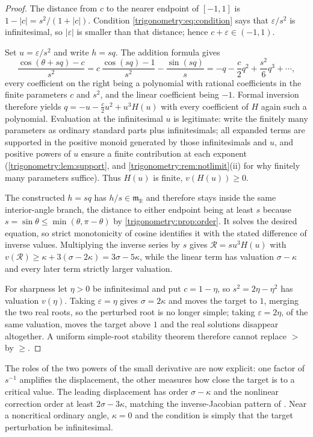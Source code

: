 \documentclass[11pt,letterpaper]{article}
\numberwithin{equation}{section}
\theoremstyle{definition}
\theoremstyle{remark}
\newcommand{\R}{\mathbb R}
\newcommand{\mm}{\mathfrak m}
\newcommand{\eps}{\varepsilon}
\begin{document}
\begin{proof}
The distance from $c$ to the nearer endpoint of $[-1,1]$ is $1-|c|=s^2/(1+|c|)$. Condition
\cref{trigonometry:eq:condition} says that $\eps/s^2$ is infinitesimal, so $|\eps|$ is smaller than
that distance; hence $c+\eps\in(-1,1)$.

Set $u=\eps/s^2$ and write $h=sq$. The addition formula gives
\begin{equation}\label{trigonometry:eq:normalizedinverse}
 \frac{\cos(\theta+sq)-c}{s^2}
 =c\,\frac{\cos(sq)-1}{s^2}-\frac{\sin(sq)}s
 =-q-\frac c2q^2+\frac{s^2}6q^3+\cdots,
\end{equation}
every coefficient on the right being a polynomial with rational coefficients in the finite
parameters $c$ and $s^2$, and the linear coefficient being $-1$. Formal inversion therefore yields
$q=-u-\frac c2u^2+u^3H(u)$ with every coefficient of $H$ again such a polynomial. Evaluation at the
infinitesimal $u$ is legitimate: write the finitely many parameters as ordinary standard parts plus
infinitesimals; all expanded terms are supported in the positive monoid generated by those
infinitesimals and $u$, and positive powers of $u$ ensure a finite contribution at each exponent
(\cref{trigonometry:lem:support}, and \cref{trigonometry:rem:notlimit}(ii) for why finitely many
parameters suffice). Thus $H(u)$ is finite, $v(H(u))\ge0$.

The constructed $h=sq$ has $h/s\in\mm_{\R}$ and therefore stays inside the same interior-angle
branch, the distance to either endpoint being at least $s$ because
$s=\sin\theta\le\min(\theta,\pi-\theta)$ by \cref{trigonometry:prop:order}. It solves the desired
equation, so strict monotonicity of cosine identifies it with the stated difference of inverse
values. Multiplying the inverse series by $s$ gives $\mathcal R=su^3H(u)$ with
$v(\mathcal R)\ge\kappa+3(\sigma-2\kappa)=3\sigma-5\kappa$, while the linear term has valuation
$\sigma-\kappa$ and every later term strictly larger valuation.

For sharpness let $\eta>0$ be infinitesimal and put $c=1-\eta$, so $s^2=2\eta-\eta^2$ has valuation
$v(\eta)$. Taking $\eps=\eta$ gives $\sigma=2\kappa$ and moves the target to $1$, merging the two
real roots, so the perturbed root is no longer simple; taking $\eps=2\eta$, of the same valuation,
moves the target above $1$ and the real solutions disappear altogether. A uniform simple-root
stability theorem therefore cannot replace $>$ by $\ge$.
\end{proof}
The roles of the two powers of the small derivative are now explicit: one factor of $s^{-1}$
amplifies the displacement, the other measures how close the target is to a critical value. The
leading displacement has order $\sigma-\kappa$ and the nonlinear correction order at least
$2\sigma-3\kappa$, matching the inverse-Jacobian pattern of \cite{SourceIntersections}. Near a
noncritical ordinary angle, $\kappa=0$ and the condition is simply that the target perturbation be
infinitesimal.
\end{document}
